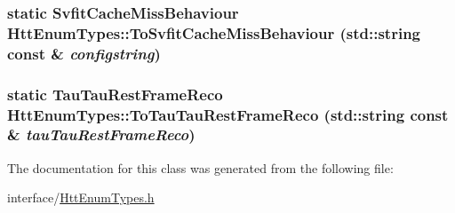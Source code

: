 \label{classHttEnumTypes_a1e57ba49f33662a1f03ce1204bded48a}
\hypertarget{classHttEnumTypes_acd2f5cc27dc531e0939477f638f90ac5}{
\subsubsection[{ToSvfitCacheMissBehaviour}]{\setlength{\rightskip}{0pt plus 5cm}static {\bf SvfitCacheMissBehaviour} HttEnumTypes::ToSvfitCacheMissBehaviour (std::string const \& {\em configstring})}}
\label{classHttEnumTypes_acd2f5cc27dc531e0939477f638f90ac5}
\hypertarget{classHttEnumTypes_a26521ff02e7d84f64cd4d39bcea272b1}{
\subsubsection[{ToTauTauRestFrameReco}]{\setlength{\rightskip}{0pt plus 5cm}static {\bf TauTauRestFrameReco} HttEnumTypes::ToTauTauRestFrameReco (std::string const \& {\em tauTauRestFrameReco})}}
\label{classHttEnumTypes_a26521ff02e7d84f64cd4d39bcea272b1}


The documentation for this class was generated from the following file:\begin{DoxyCompactItemize}
\item 
interface/\hyperlink{HttEnumTypes_8h}{HttEnumTypes.h}\end{DoxyCompactItemize}
